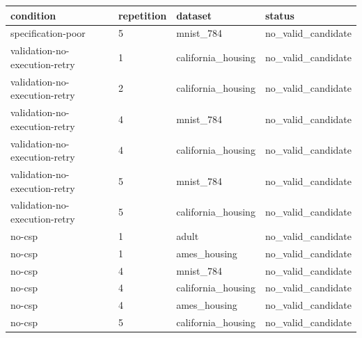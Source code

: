 \begin{tabular}{llll}
\hline
condition & repetition & dataset & status \\
\hline
specification-poor & 5 & mnist\_784 & no\_valid\_candidate \\
validation-no-execution-retry & 1 & california\_housing & no\_valid\_candidate \\
validation-no-execution-retry & 2 & california\_housing & no\_valid\_candidate \\
validation-no-execution-retry & 4 & mnist\_784 & no\_valid\_candidate \\
validation-no-execution-retry & 4 & california\_housing & no\_valid\_candidate \\
validation-no-execution-retry & 5 & mnist\_784 & no\_valid\_candidate \\
validation-no-execution-retry & 5 & california\_housing & no\_valid\_candidate \\
no-csp & 1 & adult & no\_valid\_candidate \\
no-csp & 1 & ames\_housing & no\_valid\_candidate \\
no-csp & 4 & mnist\_784 & no\_valid\_candidate \\
no-csp & 4 & california\_housing & no\_valid\_candidate \\
no-csp & 4 & ames\_housing & no\_valid\_candidate \\
no-csp & 5 & california\_housing & no\_valid\_candidate \\
\hline
\end{tabular}
